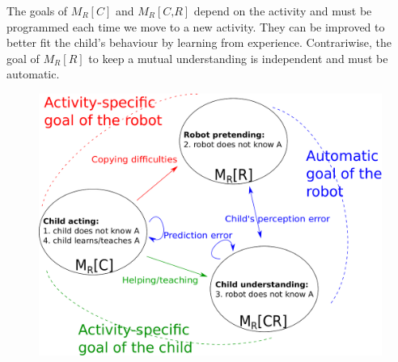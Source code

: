 \documentclass[conference]{IEEEtran}
\begin{document}
The goals of $ M_R\left[\textit{C}\right]$ and $ M_R\left[\textit{C,R}\right]$ depend on the activity and must be programmed each time we move to a new activity. They can be improved to better fit the child's behaviour by learning from experience. Contrariwise, the goal of $ M_R\left[\textit{R}\right]$ to keep a mutual understanding is independent and must be automatic. 

\begin{figure}[!]
\centering
\includegraphics[width=1\columnwidth]{mutual_behaviour}
\caption{\small\textbf{}  }
\label{mm}
\end{figure} 






\end{document}
